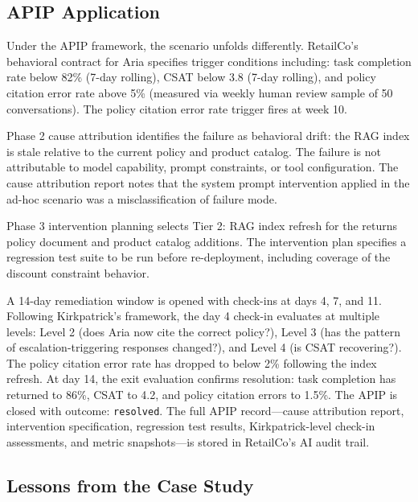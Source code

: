 \subsection{APIP Application}
\label{subsec:apip-application}

Under the APIP framework, the scenario unfolds differently. RetailCo's
behavioral contract for Aria specifies trigger conditions including: task
completion rate below 82\% (7-day rolling), CSAT below 3.8 (7-day rolling), and
policy citation error rate above 5\% (measured via weekly human review sample of
50 conversations). The policy citation error rate trigger fires at week 10.

Phase 2 cause attribution identifies the failure as behavioral drift: the RAG
index is stale relative to the current policy and product catalog. The failure
is not attributable to model capability, prompt constraints, or tool
configuration. The cause attribution report notes that the system prompt
intervention applied in the ad-hoc scenario was a misclassification of failure
mode.

Phase 3 intervention planning selects Tier 2: RAG index refresh for the returns
policy document and product catalog additions. The intervention plan specifies
a regression test suite to be run before re-deployment, including coverage of
the discount constraint behavior.

A 14-day remediation window is opened with check-ins at days 4, 7, and 11.
Following Kirkpatrick's framework, the day 4 check-in evaluates at multiple
levels: Level 2 (does Aria now cite the correct policy?), Level 3 (has the
pattern of escalation-triggering responses changed?), and Level 4 (is CSAT
recovering?). The policy citation error rate has dropped to below 2\% following
the index refresh. At day 14, the exit evaluation confirms resolution: task
completion has returned to 86\%, CSAT to 4.2, and policy citation errors to
1.5\%. The APIP is closed with outcome: \texttt{resolved}. The full APIP
record---cause attribution report, intervention specification, regression test
results, Kirkpatrick-level check-in assessments, and metric snapshots---is
stored in RetailCo's AI audit trail.

\subsection{Lessons from the Case Study}
\label{subsec:lessons}

